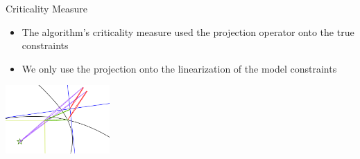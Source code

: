 \documentclass{beamer}
\begin{document}
% 


\begin{frame}{Criticality Measure}
	\begin{itemize}
		\item The algorithm's criticality measure used the projection operator onto the true constraints
		\item We only use the projection onto the linearization of the model constraints
	\end{itemize}
	\begin{center}
		\includegraphics[width=150px]{images/criticality_measure.png}
	\end{center}
\end{frame}
\end{document}
